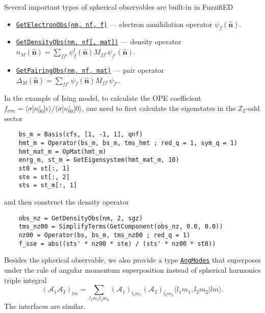 \documentclass{timesjhep}
\begin{document}
Several important types of spherical observables are built-in in FuzzifiED
\begin{itemize}
    \item \href{https://docs.fuzzified.world/models/\#FuzzifiED.GetElectronObs-Tuple{Int64,\%20Int64,\%20Int64}}{\lstinline|GetElectronObs(nm, nf, f)|} --- electron annihilation operator $\psi_f(\hat{\mathbf{n}})$.
    \item \href{https://docs.fuzzified.world/models/\#FuzzifiED.GetDensityObs-Tuple{Int64,\%20Int64,\%20Matrix{\%3C:Number}}}{\lstinline|GetDensityObs(nm, nf[, mat])|} --- density operator $n_M(\hat{\mathbf{n}})=\sum_{ff'}\psi^\dagger_{f}(\hat{\mathbf{n}})M_{ff'}\psi_{f'}(\hat{\mathbf{n}})$.
    \item \href{https://docs.fuzzified.world/models/\#FuzzifiED.GetPairingObs-Tuple{Int64,\%20Int64,\%20Matrix{\%3C:Number}}}{\lstinline|GetPairingObs(nm, nf, mat)|} --- pair operator $\Delta_M(\hat{\mathbf{n}})=\sum_{ff'}\psi_{f}(\hat{\mathbf{n}})M_{ff'}\psi_{f'}$.
\end{itemize}

In the example of Ising model, to calculate the OPE coefficient $f_{\sigma\sigma\epsilon}=\langle \sigma|n^z_{00}|\epsilon\rangle/\langle \sigma|n^z_{00}|0\rangle$, one need to first calculate the eigenstates in the $\mathbb{Z}_2$-odd sector
\begin{lstlisting}
    bs_m = Basis(cfs, [1, -1, 1], qnf)
    hmt_m = Operator(bs_m, bs_m, tms_hmt ; red_q = 1, sym_q = 1)
    hmt_mat_m = OpMat(hmt_m)
    enrg_m, st_m = GetEigensystem(hmt_mat_m, 10)
    st0 = st[:, 1]
    ste = st[:, 2]
    sts = st_m[:, 1]
\end{lstlisting}
and then construct the density operator
\begin{lstlisting}
    obs_nz = GetDensityObs(nm, 2, sgz)
    tms_nz00 = SimplifyTerms(GetComponent(obs_nz, 0.0, 0.0))
    nz00 = Operator(bs, bs_m, tms_nz00 ; red_q = 1)
    f_sse = abs((sts' * nz00 * ste) / (sts' * nz00 * st0))
\end{lstlisting}

Besides the spherical observable, we also provide a type \href{https://docs.fuzzified.world/models/\#FuzzifiED.AngModes}{\lstinline|AngModes|} that superposes under the rule of angular momentum superposition instead of spherical harmonics triple integral
\begin{equation}
    (\mathcal{A}_1\mathcal{A}_2)_{lm}=\sum_{l_1m_1l_2m_2}(\mathcal{A}_1)_{l_1m_1}(\mathcal{A}_2)_{l_2m_2}\langle l_1m_1,l_2m_2|lm\rangle.
\end{equation}
The interfaces are similar.
\end{document}
